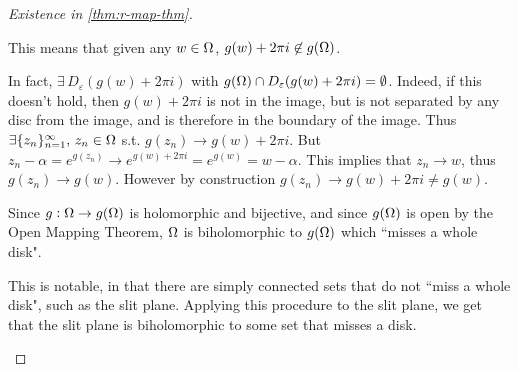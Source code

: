 \begin{proof}[Existence in \ref{thm:r-map-thm}]
\begin{enumerate}
\begin{itemize}
        
    \end{itemize}
    This means that given any $w \in \Omega$, $g(w) + 2 \pi i \not\in g(\Omega)$.
        
\begin{center}
\end{center}
        
    In fact, $\exists \, D_\varepsilon(g(w) + 2 \pi i)$ with $ g ( \Omega ) \cap  D_\varepsilon(g(w) + 2 \pi i) = \emptyset$. Indeed, if this doesn't hold, then $g(w) + 2 \pi i$ is not in the image, but is not separated by any disc from the image, and is therefore in the boundary of the image. Thus $\exists \{ z_n\} _{n=1} ^ \infty, \, z_n \in \Omega$ s.t. $g(z_n) \to g(w) + 2 \pi i$. But $z_n - \alpha = e^{g(z_n)} \to e^{g(w) + 2 \pi i} = e^{g(w)} = w - \alpha $. This implies that $z_n \to w$, thus $g(z_n) \to g(w)$. However by construction $g(z_n) \to g(w) + 2 \pi i \neq g(w)$.


\begin{remark}
Since $g:\Omega \to g(\Omega)$ is holomorphic and bijective, and since $g(\Omega)$ is open by the Open Mapping Theorem, $\Omega $ is biholomorphic to $g(\Omega)$ which ``misses a whole disk".

This is notable, in that there are simply connected sets that do not ``miss a whole disk", such as the slit plane. Applying this procedure to the slit plane, we get that the slit plane is biholomorphic to some set that misses a disk.
\end{remark}


\end{enumerate}
\end{proof}

